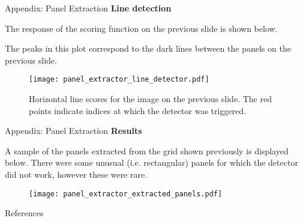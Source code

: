 \documentclass[10pt]{beamer}
\begin{document}
\begin{frame}{Appendix: Panel Extraction}
	\textbf{Line detection}
	
	The response of the scoring function on the previous slide is shown below.

	 The peaks in this plot correspond to the dark lines between the panels on the previous slide.
	\begin{figure}[b]
		\texttt{[image: panel\_extractor\_line\_detector.pdf]}
		\caption{Horizontal line scores for the image on the previous slide. The red points indicate indices at which the detector was triggered.}
	\end{figure}
\end{frame}

\begin{frame}{Appendix: Panel Extraction}
	\textbf{Results}
	
	A sample of the panels extracted from the grid shown previously is displayed below. There were some unusual (i.e. rectangular) panels for which the detector did not work, however these were rare.

	\begin{figure}[b]
		\texttt{[image: panel\_extractor\_extracted\_panels.pdf]}
	\end{figure}
\end{frame}


\begin{frame}[allowframebreaks]{References}

  
  

\end{frame}
\end{document}
